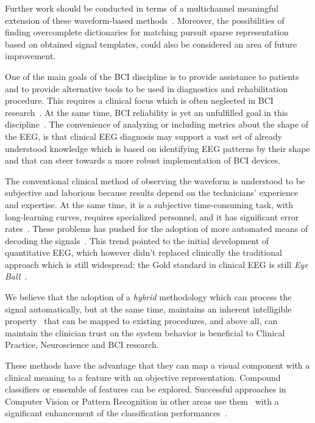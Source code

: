 \documentclass[brainsci,article,submit,moreauthors,pdftex,10pt,a4paper]{mdpi}
\begin{document}
Further work should be conducted in terms of a multichannel meaningful extension of these waveform-based methods~\citep{Gribonval2008}. Moreover, the possibilities of finding overcomplete dictionaries for matching pursuit sparse representation based on obtained signal templates, could also be considered an area of future improvement.


One of the main goals of the BCI discipline is to provide assistance to patients and to provide alternative tools to be used in diagnostics and rehabilitation procedure.  This requires a clinical focus which is often neglected in BCI research~\citep{Chavarriaga2017}.  At the same time, BCI reliability is yet an unfulfilled goal in this discipline~\citep{WolpawJonathanR2012}. The convenience of analyzing or including metrics about the shape of the EEG, is that clinical EEG diagnosis may support a vast set of already understood knowledge which is based on identifying EEG patterns by their shape and that can steer towards a more robust implementation of BCI devices.

The conventional clinical method of observing the waveform is understood to be subjective and laborious because results depend on the technicians' experience and expertise.   At the same time, it is a subjective time-consuming task, with long-learning curves, requires specialized personnel, and it has significant error rates~\citep{Tjepkema-Cloostermans2018}.  These problems has pushed for the adoption of more automated means of decoding the signals~\citep{Thakor2004}.   This trend pointed to the initial development of quantitative EEG, which however didn't replaced clinically the traditional approach which is still widespread: the Gold standard in clinical EEG is still \textit{Eye Ball}~\citep{Wulsin2011,Tjepkema-Cloostermans2018}.  

We believe that the adoption of a \textit{hybrid} methodology which can process the signal automatically, but at the same time, maintains an inherent intelligible property~\citep{j2018challenge} that can be mapped to existing procedures, and above all, can maintain the clinician trust on the system behavior is beneficial to Clinical Practice, Neuroscience and BCI research. 

These methods have the advantage that they can map a visual component with a clinical meaning to a feature with an objective representation. Compound classifiers or ensemble of features can be explored.  Successful approaches in Computer Vision or Pattern Recognition in other areas use them~\citep{Criminisi2013} with a significant enhancement of the classification performances~\citep{Gu2012}.
\end{document}
